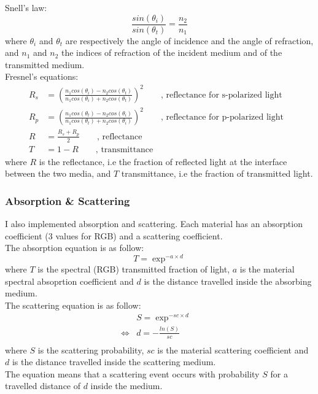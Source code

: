\documentclass[a4paper,10pt]{article}
\begin{document}
\noindent
Snell's law:
\begin{equation}
	\frac{sin(\theta_i)}{sin(\theta_t)} = \frac{n_2}{n_1}
\end{equation}
where $\theta_i$ and $\theta_t$ are respectively the angle of incidence and the angle of refraction, and $n_1$ and $n_2$ the indices of refraction of the incident medium and of the transmitted medium. \\

\noindent
Fresnel's equations:
\begin{equation}
\left.\begin{aligned}
    R_s &= (\frac{n_1cos(\theta_i) - n_2cos(\theta_t)}{n_1cos(\theta_i) + n_2cos(\theta_t)})^2 \qquad \text{, reflectance for s-polarized light}& \\
    R_p &= (\frac{n_1cos(\theta_t) - n_2cos(\theta_i)}{n_1cos(\theta_t) + n_2cos(\theta_i)})^2 \qquad \text{, reflectance for p-polarized light}& \\
    R   &= \frac{R_s + R_p}{2} \qquad \text{, reflectance}&\\
    T   &= 1 - R \qquad \text{, transmittance}
\end{aligned}\right.
\end{equation}
where $R$ is the reflectance, i.e the fraction of reflected light at the interface between the two media, and $T$ transmittance, i.e the fraction of transmitted light.

\subsubsection{Absorption \& Scattering}

I also implemented absorption and scattering. Each material has an absorption coefficient (3 values for RGB) and a scattering coefficient. \\
The absorption equation is as follow:
\begin{equation}
	T = \exp^{-a \times d}
\end{equation}
where $T$ is the spectral (RGB) transmitted fraction of light, $a$ is the material spectral absoprtion coefficient and $d$ is the distance travelled inside the absorbing medium. \\

\noindent
The scattering equation is as follow:
\begin{equation}
\left.\begin{aligned}
	&S = \exp^{-sc \times d}& \\
	\iff
	&d = -\frac{ln(S)}{sc}&\\
\end{aligned}\right.
\end{equation}
where $S$ is the scattering probability, $sc$ is the material scattering coefficient and $d$ is the distance travelled inside the scattering medium. \\
The equation means that a scattering event occurs with probability $S$ for a travelled distance of $d$ inside the medium.
\end{document}
